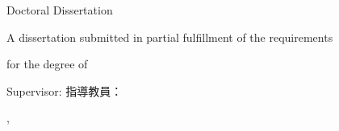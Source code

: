\begin{titlepage}
  \centering
  \vspace*{12mm}
  {\large Doctoral Dissertation\par}
  \vspace{16mm}
  {\LARGE\bfseries \ThesisTitleEN\par}
  \vspace{8mm}
  {\Large \ThesisTitleJA\par}

  \vspace{24mm}
  {\Large \ThesisAuthorEN\par}
  \vspace{2mm}
  {\large \ThesisAuthorJA\par}
  \ifdefempty{\ThesisStudentID}{}{%
    \vspace{2mm}
    {Student ID: \ThesisStudentID\par}
  }

  \vfill
  A dissertation submitted in partial fulfillment of the requirements\par
  for the degree of\par
  \vspace{2mm}
  {\large\bfseries \ThesisDegreeEN\par}
  \ThesisDegreeJA\par
  \vspace{8mm}
  Supervisor: \ThesisSupervisorEN\quad 指導教員：\ThesisSupervisorJA\par
  \vspace{12mm}
  \ThesisDepartmentEN, \ThesisGraduateSchoolEN\par
  \ThesisUniversityEN\par
  \vspace{1mm}
  \ThesisUniversityJA\ \ThesisGraduateSchoolJA\ \ThesisDepartmentJA\par
  \vspace{8mm}
  {\large \ThesisSubmissionDateEN\par}
  \ThesisSubmissionDateJA\par
\end{titlepage}
